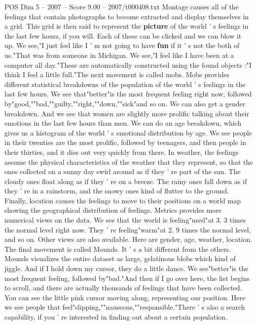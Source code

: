 \begin{textsample}{POS Dim 5 – 2007 – Score 9.00 – 2007/t000408.txt}
Montage causes all of the feelings that contain photographs to become extracted and display themselves in a grid.
This grid is then said to represent the \textbf{picture} of the world ' s feelings in the last few hours, if you will.
Each of these can be clicked and we can blow it up.
We see,"I just feel like I ' m not going to have \textbf{fun} if it ' s not the both of us."That was from someone in Michigan.
We see,"I feel like I have been at a computer all day."These are automatically constructed using the found objects :"I think I feel a little full."The next movement is called mobs.
Mobs provides different statistical breakdowns of the population of the world ' s feelings in the last few hours.
We see that"better"is the most frequent feeling right now, followed by"good,""bad,""guilty,""right,""down,""sick"and so on.
We can also get a gender breakdown.
And we see that women are slightly more prolific talking about their emotions in the last few hours than men.
We can do an age breakdown, which gives us a histogram of the world ' s emotional distribution by age.
We see people in their twenties are the most prolific, followed by teenagers, and then people in their thirties, and it dies out very quickly from there.
In weather, the feelings assume the physical characteristics of the weather that they represent, so that the ones collected on a sunny day swirl around as if they ' re part of the sun.
The cloudy ones float along as if they ' re on a breeze.
The rainy ones fall down as if they ' re in a rainstorm, and the snowy ones kind of flutter to the ground.
Finally, location causes the feelings to move to their positions on a world map showing the geographical distribution of feelings.
Metrics provides more numerical views on the data.
We see that the world is feeling"used"at 3. 3 times the normal level right now.
They ' re feeling"warm"at 2. 9 times the normal level, and so on.
Other views are also available.
Here are gender, age, weather, location.
The final movement is called Mounds.
It ' s a bit different from the others.
Mounds visualizes the entire dataset as large, gelatinous blobs which kind of jiggle.
And if I hold down my cursor, they do a little dance.
We see"better"is the most frequent feeling, followed by"bad."And then if I go over here, the list begins to scroll, and there are actually thousands of feelings that have been collected.
You can see the little pink cursor moving along, representing our position.
Here we see people that feel"slipping,""nauseous,""responsible."There ' s also a search capability, if you ' re interested in finding out about a certain population.

\end{textsample}
